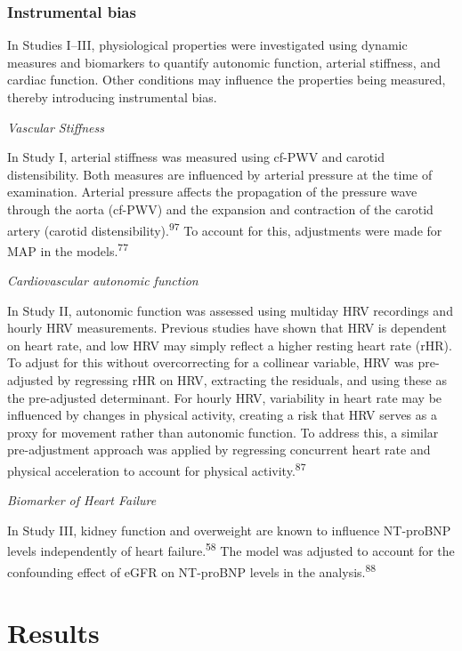 \documentclass[
  a4paper,
  headsepline=true,
  open=left]{scrbook}
\begin{document}
\hypertarget{instrumental-bias}{%
\subsection{Instrumental bias}\label{instrumental-bias}}

In Studies I--III, physiological properties were investigated using
dynamic measures and biomarkers to quantify autonomic function, arterial
stiffness, and cardiac function. Other conditions may influence the
properties being measured, thereby introducing instrumental bias.

\emph{Vascular Stiffness}

In Study I, arterial stiffness was measured using cf-PWV and carotid
distensibility. Both measures are influenced by arterial pressure at the
time of examination. Arterial pressure affects the propagation of the
pressure wave through the aorta (cf-PWV) and the expansion and
contraction of the carotid artery (carotid
distensibility).\textsuperscript{97} To account for this, adjustments
were made for MAP in the models.\textsuperscript{77}

\emph{Cardiovascular autonomic function}

In Study II, autonomic function was assessed using multiday HRV
recordings and hourly HRV measurements. Previous studies have shown that
HRV is dependent on heart rate, and low HRV may simply reflect a higher
resting heart rate (rHR). To adjust for this without overcorrecting for
a collinear variable, HRV was pre-adjusted by regressing rHR on HRV,
extracting the residuals, and using these as the pre-adjusted
determinant. For hourly HRV, variability in heart rate may be influenced
by changes in physical activity, creating a risk that HRV serves as a
proxy for movement rather than autonomic function. To address this, a
similar pre-adjustment approach was applied by regressing concurrent
heart rate and physical acceleration to account for physical
activity.\textsuperscript{87}

\emph{Biomarker of Heart Failure}

In Study III, kidney function and overweight are known to influence
NT-proBNP levels independently of heart failure.\textsuperscript{58} The
model was adjusted to account for the confounding effect of eGFR on
NT-proBNP levels in the analysis.\textsuperscript{88}


\hypertarget{results}{%
\chapter{Results}\label{results}}
\end{document}
